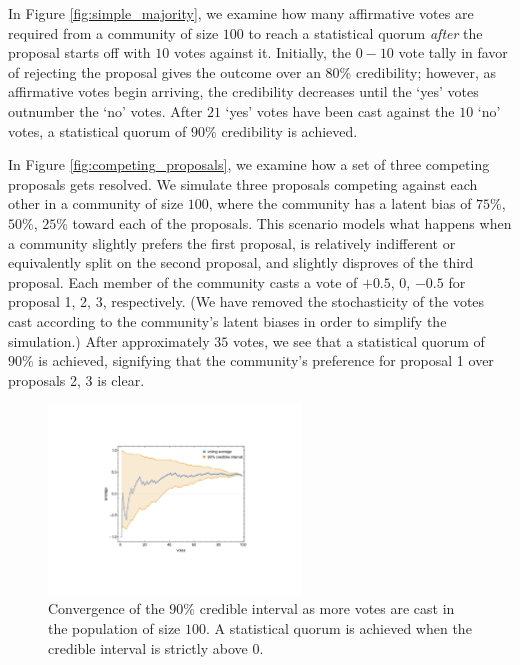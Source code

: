 \documentclass[format=acmsmall, review=true, screen=true, anonymous=true]{acmart}
\begin{document}
In Figure \ref{fig:simple_majority}, we examine how many affirmative votes are required from a community of size $100$ to reach a statistical quorum \textit{after} the proposal starts off with $10$ votes against it.  Initially, the $0-10$ vote tally in favor of rejecting the proposal gives the outcome over an $80\%$ credibility; however, as affirmative votes begin arriving, the credibility decreases until the `yes' votes outnumber the `no' votes.  After $21$ `yes' votes have been cast against the $10$ `no' votes, a statistical quorum of $90\%$ credibility is achieved.

In Figure \ref{fig:competing_proposals}, we examine how a set of three competing proposals gets resolved.  We simulate three proposals competing against each other in a community of size $100$, where the community has a latent bias of $75\%$, $50\%$, $25\%$ toward each of the proposals.  This scenario models what happens when a community slightly prefers the first proposal, is relatively indifferent or equivalently split on the second proposal, and slightly disproves of the third proposal.  Each member of the community casts a vote of $+0.5$, $0$, $-0.5$ for proposal 1, 2, 3, respectively.  (We have removed the stochasticity of the votes cast according to the community's latent biases in order to simplify the simulation.)  After approximately $35$ votes, we see that a statistical quorum of $90\%$ is achieved, signifying that the community's preference for proposal 1 over proposals 2, 3 is clear.

\begin{figure}[ht]
\centering
\includegraphics[width=0.6\textwidth]{figures/credible_interval.pdf}
\caption{Convergence of the $90\%$ credible interval as more votes are cast in the population of size $100$.  A statistical quorum is achieved when the credible interval is strictly above $0$.}
\label{fig:credible_interval}
\end{figure}
\end{document}
